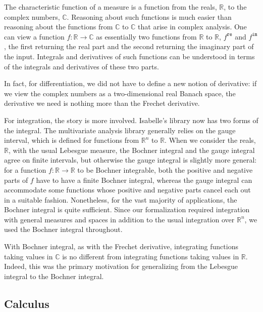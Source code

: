 \documentclass{svjour3}
\newcommand{\RR}{\mathbb{R}}
\newcommand{\CC}{\mathbb{C}}
\newcommand{\fn}[1]{\mathtt{#1}} %
\begin{document}
The characteristic function of a measure is a function from the reals, $\RR$, to the complex numbers, $\CC$. Reasoning about such functions is much easier than reasoning about the functions from $\CC$ to $\CC$ that arise in complex analysis. One can view a function $f : \RR \to \CC$ as essentially two functions from $\RR$ to $\RR$, $f^\fn{re}$ and $f^\fn{im}$, the first returning the real part and the second returning the imaginary part of the input. Integrals and derivatives of such functions can be understood in terms of the integrals and derivatives of these two parts.

In fact, for differentiation, we did not have to define a new notion of derivative: if we view the complex numbers as a two-dimensional real Banach space, the derivative we need is nothing more than the Frechet derivative. 

For integration, the story is more involved. Isabelle's library now has two forms of the integral. The multivariate analysis library generally relies on the gauge interval, which is defined for functions from $\RR^n$ to $\RR$. When we consider the reals, $\RR$, with the usual Lebesgue measure, the Bochner integral and the gauge integral agree on finite intervals, but otherwise the gauge integral is slightly more general: for a function $f : \RR \to \RR$ to be Bochner integrable, both the positive and negative parts of $f$ have to have a finite Bochner integral, whereas the gauge integral can accommodate some functions whose positive and negative parts cancel each out in a suitable fashion. Nonetheless, for the vast majority of applications, the Bochner integral is quite sufficient. Since our formalization required integration with general measures and spaces in addition to the usual integration over $\RR^n$, we used the Bochner integral throughout.

With Bochner integral, as with the Frechet derivative, integrating functions taking values in $\CC$ is no different from integrating functions taking values in $\RR$. Indeed, this was the primary motivation for generalizing from the Lebesgue integral to the Bochner integral.

\subsection{Calculus}
\end{document}
